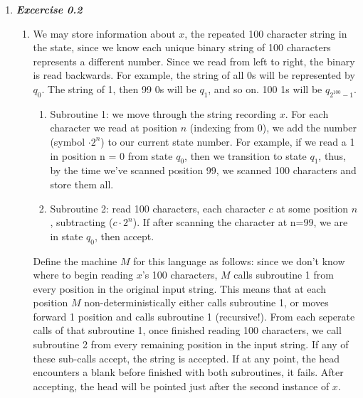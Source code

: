 \documentclass[a4paper]{article}
\begin{document}
\begin{enumerate}
\item\emph{\textbf{Excercise 0.2}}
\begin{enumerate}
\item We may store information about $x$, the repeated 100 character string in the state, since we know each unique binary string of 100 characters represents a different number. Since we read from left to right, the binary is read backwards. For example, the string of all 0s will be represented by $q_0$. The string of 1, then 99 0s will be $q_1$, and so on. 100 1s will be $q_{2^{100} -1}$. \\
\begin{enumerate}[i]
\item Subroutine 1: we move through the string recording $x$. For each character we read at position $n$ (indexing from 0), we add the number (symbol $\cdot 2^n$) to our current state number. For example, if we read a 1 in position n = 0 from state $q_0$, then we transition to state $q_{1}$, thus, by the time we've scanned position 99, we scanned 100 characters and store them all.
\item Subroutine 2: read 100 characters, each character $c$ at some position $n$, subtracting ($c \cdot 2^n$). If after scanning the character at n=99, we are in state $q_0$, then accept. \\ 
\end{enumerate}
Define the machine $M$ for this language as follows: since we don't know where to begin reading $x$'s 100 characters, $M$ calls subroutine 1 from every position in the original input string. This means that at each position $M$ non-deterministically either calls subroutine 1, or moves forward 1 position and calls subroutine 1 (recursive!). From each seperate calls of that subroutine 1, once finished reading 100 characters, we call subroutine 2 from every remaining position in the input string. If any of these sub-calls accept, the string is accepted. If at any point, the head encounters a blank before finished with both subroutines, it fails. After accepting, the head will be pointed just after the second instance of $x$. \\




\end{enumerate}
\end{enumerate}
\end{document}
